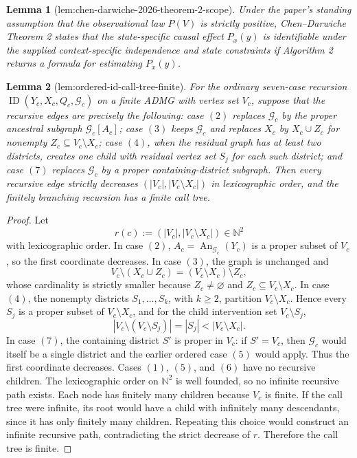 \documentclass{article}
\newtheorem{lemma}{Lemma}
\begin{document}
\begin{lemma}[lem:chen-darwiche-2026-theorem-2-scope]\label{lem:chen-darwiche-2026-theorem-2-scope}
Under the paper's standing assumption that the observational law \(P(V)\) is strictly positive, Chen--Darwiche Theorem 2 states that the state-specific causal effect \(P_x(y)\) is identifiable under the supplied context-specific independence and state constraints if Algorithm 2 returns a formula for estimating \(P_x(y)\).
\end{lemma}

\begin{lemma}[lem:ordered-id-call-tree-finite]\label{lem:ordered-id-call-tree-finite}
For the ordinary seven-case recursion \(\operatorname{ID}(Y_c,X_c,Q_c,\mathcal G_c)\) on a finite ADMG with vertex set \(V_c\), suppose that the recursive edges are precisely the following: case \((2)\) replaces \(\mathcal G_c\) by the proper ancestral subgraph \(\mathcal G_c[A_c]\); case \((3)\) keeps \(\mathcal G_c\) and replaces \(X_c\) by \(X_c\cup Z_c\) for nonempty \(Z_c\subseteq V_c\setminus X_c\); case \((4)\), when the residual graph has at least two districts, creates one child with residual vertex set \(S_j\) for each such district; and case \((7)\) replaces \(\mathcal G_c\) by a proper containing-district subgraph. Then every recursive edge strictly decreases \((|V_c|,|V_c\setminus X_c|)\) in lexicographic order, and the finitely branching recursion has a finite call tree.
\end{lemma}
\begin{proof}
Let
\[
r(c):=(|V_c|,|V_c\setminus X_c|)\in\mathbb N^2
\]
with lexicographic order. In case \((2)\), \(A_c=\operatorname{An}_{\mathcal G_c}(Y_c)\) is a proper subset of \(V_c\), so the first coordinate decreases. In case \((3)\), the graph is unchanged and
\[
V_c\setminus(X_c\cup Z_c)=(V_c\setminus X_c)\setminus Z_c,
\]
whose cardinality is strictly smaller because \(Z_c\ne\varnothing\) and \(Z_c\subseteq V_c\setminus X_c\). In case \((4)\), the nonempty districts \(S_1,\ldots,S_k\), with \(k\ge2\), partition \(V_c\setminus X_c\). Hence every \(S_j\) is a proper subset of \(V_c\setminus X_c\), and for the child intervention set \(V_c\setminus S_j\),
\[
|V_c\setminus(V_c\setminus S_j)|=|S_j|<|V_c\setminus X_c|.
\]
In case \((7)\), the containing district \(S'\) is proper in \(V_c\): if \(S'=V_c\), then \(\mathcal G_c\) would itself be a single district and the earlier ordered case \((5)\) would apply. Thus the first coordinate decreases. Cases \((1)\), \((5)\), and \((6)\) have no recursive children. The lexicographic order on \(\mathbb N^2\) is well founded, so no infinite recursive path exists. Each node has finitely many children because \(V_c\) is finite. If the call tree were infinite, its root would have a child with infinitely many descendants, since it has only finitely many children. Repeating this choice would construct an infinite recursive path, contradicting the strict decrease of \(r\). Therefore the call tree is finite.
\end{proof}
\end{document}
